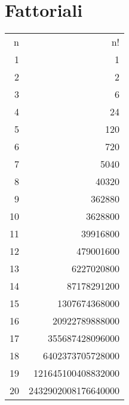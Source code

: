\section{Fattoriali}
\begin{center}
	\begin{tabular}{RR}
\toprule
n&n!\\	
1&1\\
2&2\\
3&6\\
4&24\\
5&120\\
6&720\\
7&5040\\
8&40320\\
9&362880\\
10&3628800\\
11&39916800\\
12&479001600\\
13&6227020800\\
14&87178291200\\
15&1307674368000\\
16&20922789888000\\
17&355687428096000\\
18&6402373705728000\\
19&121645100408832000\\
20&2432902008176640000\\
\bottomrule
\end{tabular} 
\end{center}